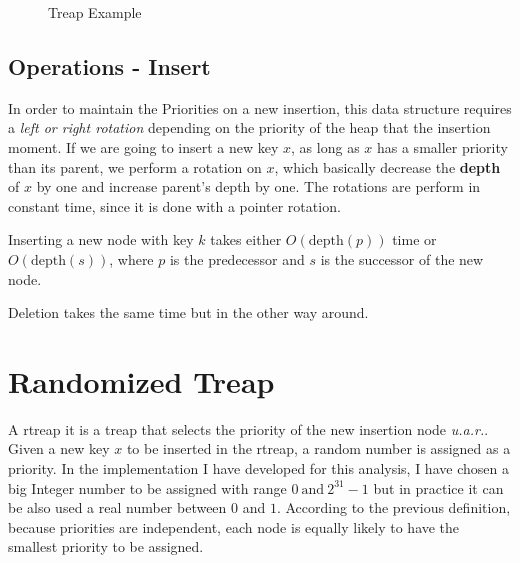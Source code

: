 \documentclass[12pt, a4paper]{article}
\begin{document}
\begin{figure}[H]
\centering
{}
\caption{Treap Example} \label{fig:treap_fig_ex}
\end{figure}

\subsection{Operations - Insert}
In order to maintain the Priorities on a new insertion, this data structure requires a \textit{left or right rotation} depending on the priority of the heap that the insertion moment. If we are going to insert a new key $x$, as long as $x$ has a smaller priority than its parent, we perform a rotation on $x$, which basically decrease the \textbf{depth} of $x$ by one and increase parent's depth by one. The rotations are perform in constant time, since it is done with a pointer rotation.

Inserting a new node with key $k$ takes either $O(\text{depth}(p))$ time or $O(\text{depth}(s))$, where $p$ is the predecessor and $s$ is the successor of the new node.

Deletion takes the same time but in the other way around.

\section{Randomized Treap}
A \acrshort{rtreap} it is a \acrshort{treap} that selects the priority of the new insertion node \textit{u.a.r.}.
Given a new key $x$ to be inserted in the \acrshort{rtreap}, a random number is assigned as a priority. In the implementation I have developed for this analysis, I have chosen a big Integer number to be assigned with range $0\ \text{and}\ 2^{31}-1$ but in practice it can be also used a real number between $0$ and $1$. According to the previous definition, because priorities are independent, each node is equally likely to have the smallest priority to be assigned.
\end{document}
